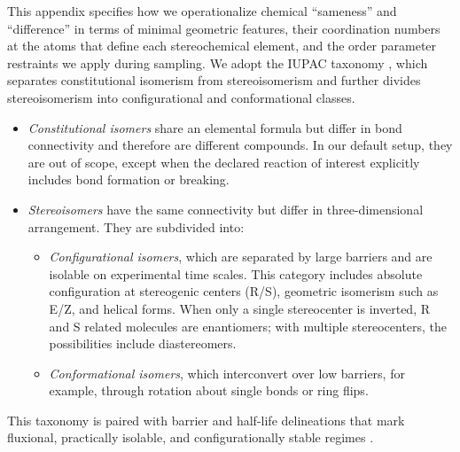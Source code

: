 \documentclass[]{fairmeta}
\theoremstyle{remark}
\begin{document}
This appendix specifies how we operationalize chemical ``sameness'' and ``difference'' in terms of minimal geometric features, their coordination numbers at the atoms that define each stereochemical element, and the order parameter restraints we apply during sampling.
We adopt the IUPAC taxonomy \citep{mcnaught1997compendium}, which separates constitutional isomerism from stereoisomerism and further divides stereoisomerism into configurational and conformational classes.
\begin{itemize}[leftmargin=*]
\item \textit{Constitutional isomers} share an elemental formula but differ in bond connectivity and therefore are different compounds.
In our default setup, they are out of scope, except when the declared reaction of interest explicitly includes bond formation or breaking.
\item \textit{Stereoisomers} have the same connectivity but differ in three-dimensional arrangement.
They are subdivided into:
\begin{itemize}
    \item \textit{Configurational isomers}, which are separated by large barriers and are isolable on experimental time scales.
    This category includes absolute configuration at stereogenic centers (R/S), geometric isomerism such as E/Z, and helical forms.
    When only a single stereocenter is inverted, R and S related molecules are enantiomers; with multiple stereocenters, the possibilities include diastereomers.
    \item \textit{Conformational isomers}, which interconvert over low barriers, for example, through rotation about single bonds or ring flips.
\end{itemize}
\end{itemize}
This taxonomy is paired with barrier and half-life delineations that mark fluxional, practically isolable, and configurationally stable regimes \citep{canfield2018new}.
\end{document}
